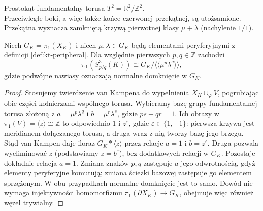 \medskip
\begin{center}

{\footnotesize Prostokąt fundamentalny torusa $T^2=\mathbb R^2/\mathbb Z^2$. \\
Przeciwległe boki, a więc także końce czerwonej przekątnej, są utożsamione. \\
Przekątna wyznacza zamkniętą krzywą pierwotnej klasy $\mu+\lambda$ (nachylenie $1/1$).}
\end{center}
\medskip

\begin{stwierdzenie}
\label{prop:kt-dehn-pi1}
Niech $G_K=\pi_1(X_K)$ i niech $\mu,\lambda\in G_K$
będą elementami peryferyjnymi z definicji
\ref{def:kt-peripheral}. Dla względnie pierwszych
$p,q\in\mathbb Z$ zachodzi
\[
\pi_1(S^3_{p/q}(K))\cong
G_K/\langle\!\langle\mu^p\lambda^q\rangle\!\rangle,
\]
gdzie podwójne nawiasy oznaczają normalne domknięcie
w $G_K$.
\end{stwierdzenie}
\begin{proof}
Stosujemy twierdzenie van Kampena do wypełnienia
$X_K\cup_\varphi V$, pogrubiając obie części kołnierzami
wspólnego torusa. Wybieramy bazę grupy fundamentalnej
torusa złożoną z $a=\mu^p\lambda^q$ i
$b=\mu^r\lambda^s$, gdzie $ps-qr=1$.
Ich obrazy w $\pi_1(V)=\langle z\rangle\cong\mathbb Z$
to odpowiednio $1$ i $z^\varepsilon$, gdzie
$\varepsilon\in\{1,-1\}$: pierwsza krzywa jest
meridianem dołączanego torusa, a druga wraz z nią
tworzy bazę jego brzegu. Stąd van Kampen daje iloraz
$G_K*\langle z\rangle$ przez relacje $a=1$ i
$b=z^\varepsilon$. Druga pozwala wyeliminować $z$
(podstawiamy $z=b^\varepsilon$), bez dodatkowych relacji
w $G_K$. Pozostaje dokładnie relacja $a=1$.
Zmiana znaków $p,q$ zastępuje $a$ jego odwrotnością,
gdyż elementy peryferyjne komutują; zmiana ścieżki
bazowej zastępuje go elementem sprzężonym.
W obu przypadkach normalne domknięcie jest to samo.
Dowód nie wymaga injektywności homomorfizmu
$\pi_1(\partial X_K)\to G_K$, obejmuje więc również
węzeł trywialny.
\end{proof}

